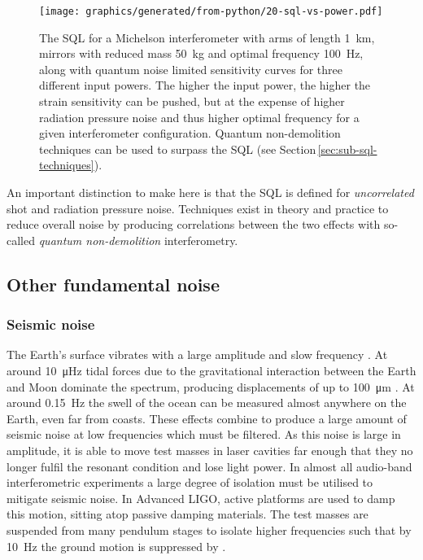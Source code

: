 \begin{figure}
  \centering
  \texttt{[image: graphics/generated/from-python/20-sql-vs-power.pdf]}
  \caption[Standard quantum limit and the quantum noise with various input powers]{\label{fig:sql-vs-input-power}The \gls{SQL} for a Michelson interferometer with arms of length \SI{1}{\kilo\meter}, mirrors with reduced mass \SI{50}{\kilo\gram} and optimal frequency \SI{100}{\hertz}, along with quantum noise limited sensitivity curves for three different input powers. The higher the input power, the higher the strain sensitivity can be pushed, but at the expense of higher radiation pressure noise and thus higher optimal frequency for a given interferometer configuration. Quantum non-demolition techniques can be used to surpass the \gls{SQL} (see Section\,\ref{sec:sub-sql-techniques}).}
\end{figure}

An important distinction to make here is that the \gls{SQL} is defined for \emph{uncorrelated} shot and radiation pressure noise. Techniques exist in theory and practice to reduce overall noise by producing correlations between the two effects with so-called \emph{quantum non-demolition} interferometry. 

\subsection{Other fundamental noise}

\subsubsection{Seismic noise}
The Earth's surface vibrates with a large amplitude and slow frequency \cite{ET2011}. At around \SI{10}{\micro\hertz} tidal forces due to the gravitational interaction between the Earth and Moon dominate the spectrum, producing displacements of up to \SI{100}{\micro\meter} \cite{Adhikari2004}. At around \SI{0.15}{\hertz} the swell of the ocean can be measured almost anywhere on the Earth, even far from coasts. These effects combine to produce a large amount of seismic noise at low frequencies which must be filtered. As this noise is large in amplitude, it is able to move test masses in laser cavities far enough that they no longer fulfil the resonant condition and lose light power. In almost all audio-band interferometric experiments a large degree of isolation must be utilised to mitigate seismic noise. In Advanced \gls{LIGO}, active platforms are used to damp this motion, sitting atop passive damping materials. The test masses are suspended from many pendulum stages to isolate higher frequencies such that by \SI{10}{\hertz} the ground motion is suppressed by .

